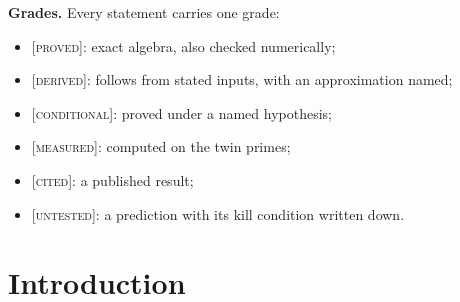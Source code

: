 \documentclass[11pt]{article}
\theoremstyle{definition}
\theoremstyle{remark}
\newcommand{\grade}[1]{\textsc{[#1]}}
\begin{document}
\begin{abstract}
\begin{enumerate}
\item \emph{Where the turn is set.} A curvature dial and its opposite setup show that the turn is set by the walk's first steps, not at the wall crossing. The wall reading is killed in both setups.
\item \emph{Other prime pairs.} Cousin and sexy primes, with one arm rule (the residue mod~$5$), share the slope $1/\sqrt3$ and the early wall crossing. The turn is not a Hardy--Littlewood quantity: twins and cousins share the constant but differ by $2.7^\circ$.
\item \emph{The dodecahedral honeycomb.} The twin arms are the edges of the $\{5,3,4\}$ honeycomb, whose edge has $\cosh\ell=\varphi$ and $\Gamma^2=\sqrt5-2$. Two perpendicular edges turn the frame by exactly $\arctan\tfrac12$. Walked on the honeycomb, the order of the twin end digits alone shows a prime signal at $z=-51$; about $16\%$ of it is memory beyond consecutive pairs.
\item \emph{Two predictions of version 1 settled.} The $7/9$ split offset and the cousin tilt both pass.
\item \emph{The 186 bound.} The main terms of OpenAI's certificate are confirmed independently. The gap $182$ is out of reach with their inputs.
\end{enumerate}
A closing section reads these results against a view of light as the fixed stage and the electron as the mover. That section is interpretation, and is labelled as such.
\end{abstract}

\tableofcontents
\bigskip

\noindent\textbf{Grades.} Every statement carries one grade:
\begin{itemize}
\item \grade{proved}: exact algebra, also checked numerically;
\item \grade{derived}: follows from stated inputs, with an approximation named;
\item \grade{conditional}: proved under a named hypothesis;
\item \grade{measured}: computed on the twin primes;
\item \grade{cited}: a published result;
\item \grade{untested}: a prediction with its kill condition written down.
\end{itemize}

\section{Introduction}
\end{document}

